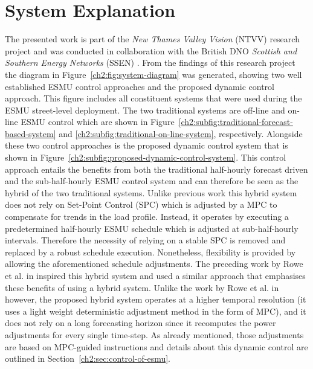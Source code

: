 \section{System Explanation}
\label{ch2:sec:system-explanation}



The presented work is part of the \textit{New Thames Valley Vision} (NTVV) research project and was conducted in collaboration with the British DNO \textit{Scottish and Southern Energy Networks} (SSEN) \cite{NTVV2016}.
From the findings of this research project the diagram in Figure~\ref{ch2:fig:system-diagram} was generated, showing two well established ESMU control approaches and the proposed dynamic control approach.
This figure includes all constituent systems that were used during the ESMU street-level deployment.
The two traditional systems are off-line and on-line ESMU control which are shown in Figure~\ref{ch2:subfig:traditional-forecast-based-system} and \ref{ch2:subfig:traditional-on-line-system}, respectively.
Alongside these two control approaches is the proposed dynamic control system that is shown in Figure~\ref{ch2:subfig:proposed-dynamic-control-system}.
This control approach entails the benefits from both the traditional half-hourly forecast driven and the sub-half-hourly ESMU control system and can therefore be seen as the hybrid of the two traditional systems.
Unlike previous work this hybrid system does not rely on Set-Point Control (SPC) which is adjusted by a MPC to compensate for trends in the load profile.
Instead, it operates by executing a predetermined half-hourly ESMU schedule which is adjusted at sub-half-hourly intervals.
Therefore the necessity of relying on a stable SPC is removed and replaced by a robust schedule execution.
Nonetheless, flexibility is provided by allowing the aforementioned schedule adjustments.
The preceding work by Rowe et al. in \cite{Rowe2014} inspired this hybrid system and used a similar approach that emphasises these benefits of using a hybrid system.
Unlike the work by Rowe et al. in \cite{Rowe2014} however, the proposed hybrid system operates at a higher temporal resolution (it uses a light weight deterministic adjustment method in the form of MPC), and it does not rely on a long forecasting horizon since it recomputes the power adjustments for every single time-step.
As already mentioned, those adjustments are based on MPC-guided instructions and details about this dynamic control are outlined in Section~\ref{ch2:sec:control-of-esmu}.

